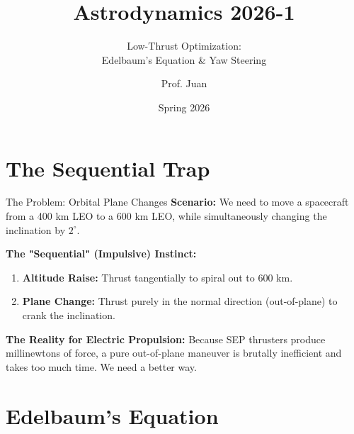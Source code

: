 \documentclass[11pt]{beamer}
\title[Edelbaum's Equation]{Astrodynamics 2026-1}
\subtitle{Low-Thrust Optimization: \\ Edelbaum's Equation \& Yaw Steering}
\author{Prof. Juan}
\institute{Universidad de Antioquia - Aerospace Engineering}
\date{Spring 2026}
\begin{document}
\begin{frame}
    \titlepage
\end{frame}

\section{The Sequential Trap}

\begin{frame}{The Problem: Orbital Plane Changes}
    \textbf{Scenario:} We need to move a spacecraft from a 400 km LEO to a 600 km LEO, while simultaneously changing the inclination by $2^\circ$.
    
    \vspace{0.4cm}
    \textbf{The "Sequential" (Impulsive) Instinct:}
    \begin{enumerate}
        \item \textbf{Altitude Raise:} Thrust tangentially to spiral out to 600 km.
        \item \textbf{Plane Change:} Thrust purely in the normal direction (out-of-plane) to crank the inclination.
    \end{enumerate}
    
    \vspace{0.4cm}
    \textbf{The Reality for Electric Propulsion:}
    Because SEP thrusters produce millinewtons of force, a pure out-of-plane maneuver is brutally inefficient and takes too much time. We need a better way.
\end{frame}

\section{Edelbaum's Equation}
\end{document}
